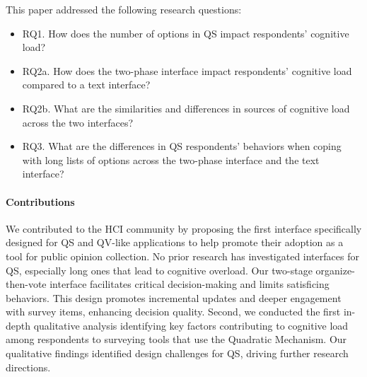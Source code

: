 This paper addressed the following research questions:

\begin{itemize}
    \item RQ1. How does the number of options in QS impact respondents' cognitive load?
    \item RQ2a. How does the two-phase interface impact respondents' cognitive load compared to a text interface?
    \item RQ2b. What are the similarities and differences in sources of cognitive load across the two interfaces?
    \item RQ3. What are the differences in QS respondents' behaviors when coping with long lists of options across the two-phase interface and the text interface?
\end{itemize}

\paragraph{Contributions}
We contributed to the HCI community by proposing the first interface specifically designed for QS and QV-like applications 
to help promote their adoption as a tool for public opinion collection. No prior research has investigated interfaces for QS, especially long ones that lead to cognitive overload. Our two-stage organize-then-vote interface facilitates critical decision-making and limits satisficing behaviors. This design promotes incremental updates and deeper engagement with survey items, enhancing decision quality. Second, we conducted the first in-depth qualitative analysis identifying key factors contributing to cognitive load among respondents to surveying tools that use the Quadratic Mechanism. Our qualitative findings identified design challenges for QS, driving further research directions.




